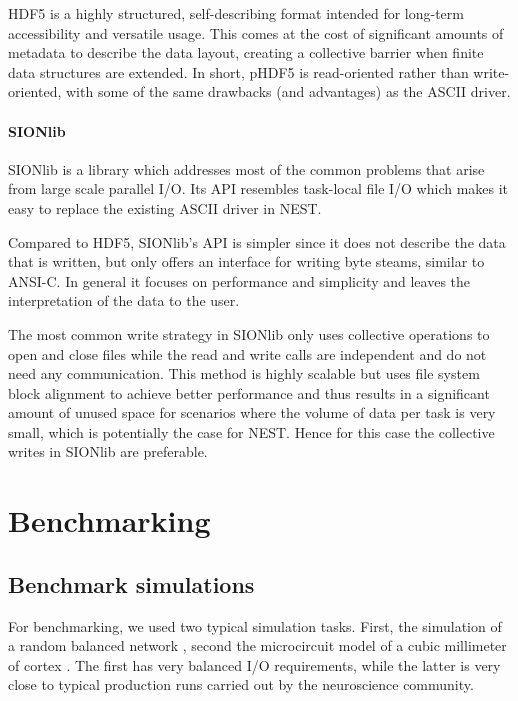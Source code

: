 \documentclass[]{YIC2015}
\begin{document}
HDF5 is a highly structured, self-describing format intended for
long-term accessibility and versatile usage. This comes at the cost of
significant amounts of metadata to describe the data layout, creating
a collective barrier when finite data structures are extended. In
short, pHDF5 is read-oriented rather than write-oriented, with some of
the same drawbacks (and advantages) as the ASCII driver.


\paragraph{SIONlib}

SIONlib \cite{frings2009scalable} is a library which addresses most of
the common problems that arise from large scale parallel I/O. Its API
resembles task-local file I/O which makes it easy to replace the
existing ASCII driver in NEST.

Compared to HDF5, SIONlib's API is simpler since it does not describe
the data that is written, but only offers an interface for writing
byte steams, similar to ANSI-C. In general it focuses on performance
and simplicity and leaves the interpretation of the data to the user.

The most common write strategy in SIONlib only uses collective
operations to open and close files while the read and write calls are
independent and do not need any communication. This method is highly
scalable but uses file system block alignment to achieve better
performance and thus results in a significant amount of unused space
for scenarios where the volume of data per task is very small, which
is potentially the case for NEST. Hence for this case the collective
writes in SIONlib are preferable.

\section{Benchmarking}

\subsection{Benchmark simulations}\label{sect:use_cases}

For benchmarking,
we used two typical simulation tasks. First, the
simulation of a random balanced network \cite{morrison07}, second the
microcircuit model of a cubic millimeter of cortex \cite{potjans14}.
The first has very balanced I/O requirements, while the latter is very
close to typical production runs carried out by the neuroscience
community.
\end{document}
